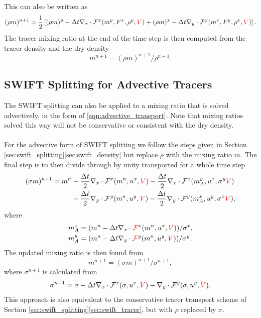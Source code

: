 \documentclass{ametsocV6.1}
\newcommand{\change}[1]{\textcolor{red}{#1}}
\begin{document}
This can also be written as
\begin{equation}
(\rho m)^{n+1} = \frac{1}{2}\left[(\rho m)^y - \Delta t \nabla_x\cdot \mathcal{F}^x(m^y,F^{x},\rho^y, \change{V}) + (\rho m)^x - \Delta t \nabla_y\cdot \mathcal{F}^y(m^x,F^{y},\rho^x, \change{V}) \right].
\end{equation}
The tracer mixing ratio at the end of the time step is then computed from the tracer density and the dry density
\begin{equation}
    m^{n+1} = (\rho m)^{n+1} / \rho^{n+1}.
\end{equation}

\subsection{SWIFT Splitting for Advective Tracers}

The SWIFT splitting can also be applied to a mixing ratio that is solved advectively, in the form of \eqref{eqn:advective_transport}. Note that mixing ratios solved this way will not be conservative or consistent with the dry density. \\ 
\\
For the advective form of SWIFT splitting we follow the steps given in Section \ref{sec:swift_splitting}\ref{sec:swift_density} but replace $\rho$ with the mixing ratio $m$. The final step is to then divide through by unity transported for a whole time step
\begin{equation}
\begin{split}
(\sigma m)^{n+1} = m^{n} & - \frac{\Delta{t}}{2}\nabla_x\cdot \mathcal{F}^x(m^n, u^x, \change{V}) - \frac{\Delta{t}}{2}\nabla_x\cdot \mathcal{F}^x(m^y_A, u^x, \sigma^y\change{V}) \\
& - \frac{\Delta{t}}{2}\nabla_y\cdot \mathcal{F}^y(m^n, u^y, \change{V}) - \frac{\Delta{t}}{2}\nabla_y\cdot \mathcal{F}^y(m^x_A, u^y, \sigma^x\change{V}),
\end{split}
\end{equation}
where
\begin{align}
    m^x_A &= (m^n - \Delta{t} \nabla_x\cdot \change{\mathcal{F}}^x(m^n, u^x, \change{V})) / \sigma^x, \\
    m^y_A &= (m^n - \Delta{t} \nabla_y\cdot \change{\mathcal{F}}^y(m^n, u^y, \change{V})) / \sigma^y.
\end{align}
The updated mixing ratio is then found from
\begin{equation}
m^{n+1} = (\sigma m)^{n+1}/\sigma^{n+1},
\end{equation}
where $\sigma^{n+1}$ is calculated from
\begin{equation}
\sigma^{n+1} = \sigma - \Delta{t} \nabla_x\cdot \mathcal{F}^x(\sigma, u^x, \change{V}) -  \nabla_y \cdot \mathcal{F}^y(\sigma, u^y, \change{V}).
\end{equation}
This approach is also equivalent to the conservative tracer transport scheme of Section \ref{sec:swift_splitting}\ref{sec:swift_tracer}, but with $\rho$ replaced by $\sigma$.
\end{document}
